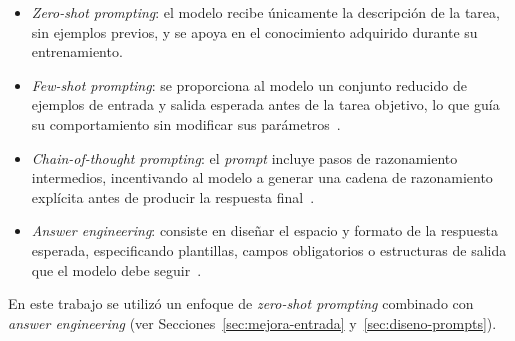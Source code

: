 \begin{itemize}
  \item \textit{Zero-shot prompting}: el modelo recibe únicamente la descripción de la tarea, sin ejemplos previos, y se apoya en el conocimiento adquirido durante su entrenamiento.
  \item \textit{Few-shot prompting}: se proporciona al modelo un conjunto reducido de ejemplos de entrada y salida esperada antes de la tarea objetivo, lo que guía su comportamiento sin modificar sus parámetros~\cite{brown2020language}.
  \item \textit{Chain-of-thought prompting}: el \textit{prompt} incluye pasos de razonamiento intermedios, incentivando al modelo a generar una cadena de razonamiento explícita antes de producir la respuesta final~\cite{wei2022chainofthought}.
  \item \textit{Answer engineering}: consiste en diseñar el espacio y formato de la respuesta esperada, especificando plantillas, campos obligatorios o estructuras de salida que el modelo debe seguir~\cite{liu2021prompting}.
\end{itemize}

En este trabajo se utilizó un enfoque de \textit{zero-shot prompting} combinado con \textit{answer engineering} (ver Secciones~\ref{sec:mejora-entrada} y~\ref{sec:diseno-prompts}).

